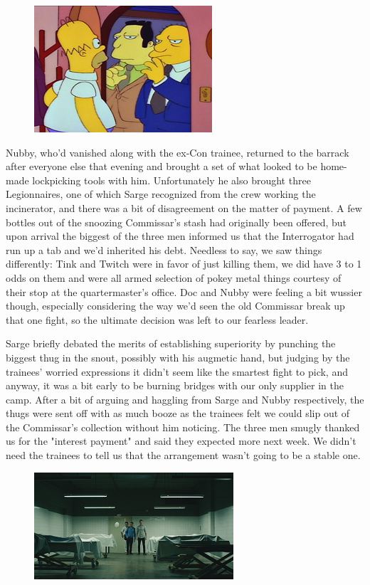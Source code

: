 \begin{figure}
	\begin{center}
		\includegraphics[width=\figwidth]{pics/21/24.png}
	\end{center}
\end{figure}
Nubby, who'd vanished along with the ex-Con trainee, returned to the barrack after everyone else that evening and brought a set of what looked to be home-made lockpicking tools with him. 
Unfortunately he also brought three Legionnaires, one of which Sarge recognized from the crew working the incinerator, and there was a bit of disagreement on the matter of payment. 
A few bottles out of the snoozing Commissar's stash had originally been offered, but upon arrival the biggest of the three men informed us that the Interrogator had run up a tab and we'd inherited his debt. 
Needless to say, we saw things differently: 
Tink and Twitch were in favor of just killing them, we did have 3 to 1 odds on them and were all armed selection of pokey metal things courtesy of their stop at the quartermaster's office. 
Doc and Nubby were feeling a bit wussier though, especially considering the way we'd seen the old Commissar break up that one fight, so the ultimate decision was left to our fearless leader.

Sarge briefly debated the merits of establishing superiority by punching the biggest thug in the snout, possibly with his augmetic hand, but judging by the trainees' worried expressions it didn't seem like the smartest fight to pick, and anyway, it was a bit early to be burning bridges with our only supplier in the camp. 
After a bit of arguing and haggling from Sarge and Nubby respectively, the thugs were sent off with as much booze as the trainees felt we could slip out of the Commissar's collection without him noticing. 
The three men smugly thanked us for the "interest payment" and said they expected more next week. 
We didn't need the trainees to tell us that the arrangement wasn't going to be a stable one.

\begin{figure}
	\begin{center}
		\includegraphics[width=\figwidth]{pics/21/25.png}
	\end{center}
\end{figure}

